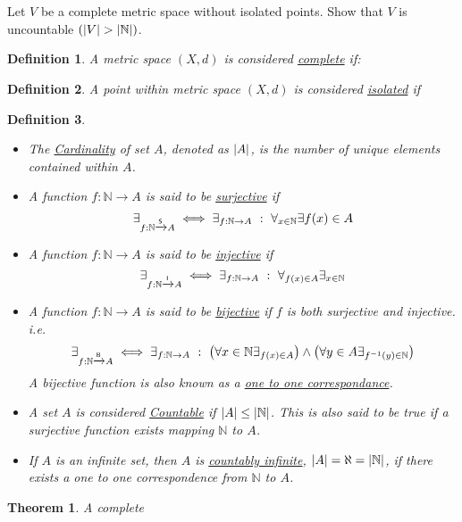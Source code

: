 \documentclass[]{article}
\newcommand{\N}{\mathbb{N}}
\newcommand{\toI}{\xrightarrow{\textsf{\tiny I}}}
\newcommand{\toS}{\xrightarrow{\textsf{\tiny S}}}
\newcommand{\toB}{\xrightarrow{\textsf{\tiny B}}}
\newcommand{\st}{\ : \ }
\newtheorem{definition}{Definition}
\newtheorem{theorem}{Theorem}
\begin{document}
\newpage
\section{}
Let $V$ be a complete metric space without isolated points.
Show that $V$ is uncountable $(\abs{V} > \abs{\N})$.

\begin{definition}
    A metric space $(X,d)$ is considered \emph{\underline{complete}} if:

\end{definition}

\begin{definition}
    A point within metric space $(X,d)$ is considered \emph{\underline{isolated}} if 
\end{definition}


\begin{definition}
    \begin{itemize}
        \item The \emph{\underline{Cardinality}} of set $A$,
        denoted as $\abs{A}$,
        is the number of unique elements contained within $A$.
        
        \item A function $f : \N \to A$ is said to be \underline{\emph{surjective}} if\[
            \exists_{f : \N \toS A} \iff 
            \exists_{f : \N \to A} \st \forall_{x \in \N} \exists f(x) \in A
        \]

        \item A function $f : \N \to A$ is said to be \underline{\emph{injective}} if\[
            \exists_{f : \N \toI A} \iff 
            \exists_{f : \N \to A} \st \forall_{f(x) \in A} \exists_{x \in \N}
        \]

        \item A function $f : \N \to A$ is said to be \underline{\emph{bijective}} 
        if $f$ is both surjective and injective.
        i.e.\[
            \exists_{f : \N \toB A} \iff 
            \exists_{f : \N \to A} \st 
                \qty(\forall{x \in \N} \exists_{f(x) \in A}) \land
                \qty(\forall{y \in A} \exists_{f^{-1}(y) \in \N})
        \]
        A bijective function is also known as a \emph{\underline{one to one correspondance}}.

        \item A set $A$ is considered \emph{\underline{Countable}} if $\abs{A} \leq \abs{\N}$. 
        This is also said to be true if a surjective function exists mapping $\N$ to $A$.
        
        \item If $A$ is an infinite set, then $A$ is \emph{\underline{countably infinite}},
        $\abs{A} = \aleph = \abs{\N}$, 
        if there exists a one to one correspondence from $\N$ to $A$.
    \end{itemize}
\end{definition}


\begin{theorem}
    A complete 

\end{theorem}
\end{document}
